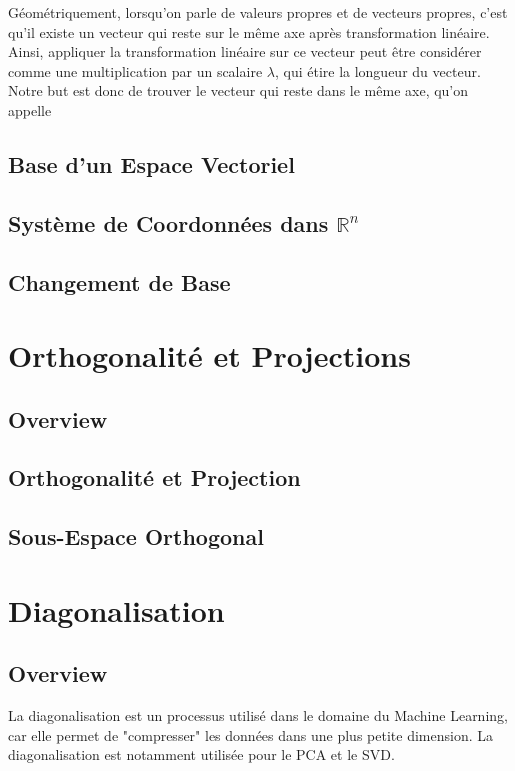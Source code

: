 \documentclass{article}
\begin{document}
Géométriquement, lorsqu'on parle de valeurs propres et de vecteurs propres, c'est
qu'il existe un vecteur qui reste sur le même axe après transformation linéaire.
Ainsi, appliquer la transformation linéaire sur ce vecteur peut être considérer
comme une multiplication par un scalaire $\lambda$, qui étire la longueur du vecteur.
Notre but est donc de trouver le vecteur qui reste dans le même axe, qu'on appelle


\subsection{Base d'un Espace Vectoriel}

\subsection{Système de Coordonnées dans $\mathbb{R}^n$}

\subsection{Changement de Base}

\pagebreak
\section{Orthogonalité et Projections}
\subsection{Overview}

\subsection{Orthogonalité et Projection}
\subsection{Sous-Espace Orthogonal}

\pagebreak

\section{Diagonalisation}
\subsection{Overview}

La diagonalisation est un processus utilisé dans le domaine du Machine Learning,
car elle permet de "compresser" les données dans une plus petite dimension. La
diagonalisation est notamment utilisée pour le PCA et le SVD.\\
\end{document}
